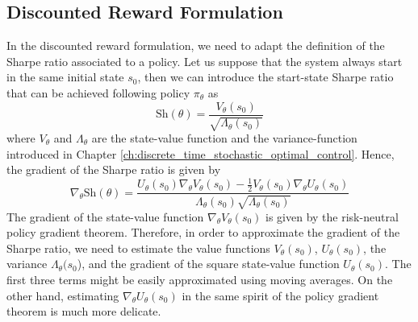 \subsection{Discounted Reward Formulation}
In the discounted reward formulation, we need to adapt the definition of the Sharpe ratio associated to a policy. Let us suppose that the system always start in the same initial state $s_0$, then we can introduce the start-state Sharpe ratio that can be achieved following policy $\pi_\theta$ as
\begin{equation}
	\text{Sh}(\theta) = \frac{V_\theta(s_0)}{\sqrt{\Lambda_\theta(s_0)}}
\end{equation}
where $V_\theta$ and $\Lambda_\theta$ are the state-value function and the variance-function introduced in Chapter \ref{ch:discrete_time_stochastic_optimal_control}. 
Hence, the gradient of the Sharpe ratio is given by
\begin{equation}
	\nabla_\theta \text{Sh}(\theta) = \frac{U_\theta(s_0) \nabla_\theta V_\theta(s_0) - \frac{1}{2} V_\theta(s_0) \nabla_\theta U_\theta(s_0)}{\Lambda_\theta(s_0) \sqrt{\Lambda_\theta(s_0)}}
\end{equation}
The gradient of the state-value function $\nabla_\theta V_\theta(s_0)$ is given by the risk-neutral policy gradient theorem. Therefore, in order to approximate the gradient of the Sharpe ratio, we need to estimate the value functions $V_\theta(s_0)$, $U_\theta(s_0)$, the variance $\Lambda_\theta(s_0$), and the gradient of the square state-value function $U_\theta (s_0)$. The first three terms might be easily approximated using moving averages. On the other hand, estimating $\nabla_\theta U_\theta(s_0)$ in the same spirit of the policy gradient theorem is much more delicate. 
